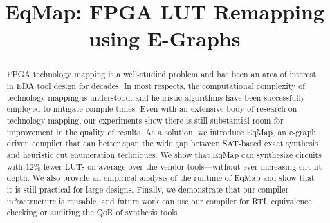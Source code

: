 \documentclass[10pt,conference]{IEEEtran}
\newcommand{\fullname}{EqMap: FPGA LUT Remapping using E-Graphs}
\newcommand{\shortname}{EqMap}
\newcommand{\metric}{12\% fewer LUTs}
\begin{document}
\title{\fullname}
\author{
}
\maketitle

\begin{abstract}
    FPGA technology mapping is a well-studied problem and has been an area of
    interest in EDA tool design for decades. In most respects, the computational
    complexity of technology mapping is understood, and heuristic algorithms have
    been successfully employed to mitigate compile times. Even with an extensive
    body of research on technology mapping, our experiments show there is still
    substantial room for improvement in the quality of results. As a solution, we
    introduce \shortname{}, an e-graph driven compiler that can better span the
    wide gap between SAT-based exact synthesis and heuristic cut enumeration
    techniques. We show that \shortname{} can synthesize circuits with \metric{} on
    average over the vendor tools---without ever increasing circuit depth. We also
    provide an empirical analysis of the runtime of \shortname{} and show that it
    is still practical for large designs. Finally, we demonstrate that our compiler
    infrastructure is reusable, and future work can use our compiler for RTL
    equivalence checking or auditing the QoR of synthesis tools.
\end{abstract}












\end{document}
